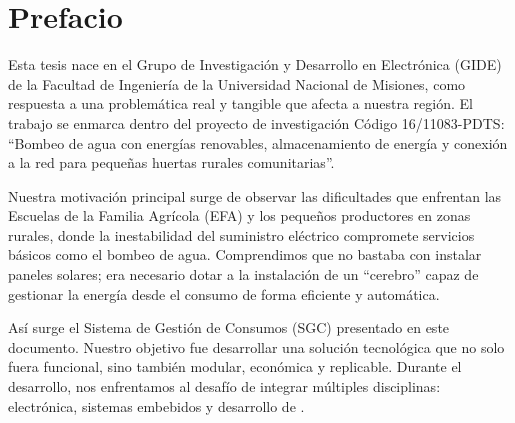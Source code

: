 \cleardoublepage
\chapter*{Prefacio} 

Esta tesis nace en el Grupo de Investigación y Desarrollo en Electrónica (GIDE) de la Facultad de Ingeniería de la Universidad Nacional de Misiones, como respuesta a una problemática real y tangible que afecta a nuestra región. El trabajo se enmarca dentro del proyecto de investigación Código 16/11083-PDTS: “Bombeo de agua con energías renovables, almacenamiento de energía y conexión a la red para pequeñas huertas rurales comunitarias”.

Nuestra motivación principal surge de observar las dificultades que enfrentan las Escuelas de la Familia Agrícola (EFA) y los pequeños productores en zonas rurales, donde la inestabilidad del suministro eléctrico compromete servicios básicos como el bombeo de agua. Comprendimos que no bastaba con instalar paneles solares; era necesario dotar a la instalación de un ``cerebro'' capaz de gestionar la energía desde el consumo de forma eficiente y automática.

Así surge el Sistema de Gestión de Consumos (SGC) presentado en este documento. Nuestro objetivo fue desarrollar una solución tecnológica que no solo fuera funcional, sino también modular, económica y replicable. Durante el desarrollo, nos enfrentamos al desafío de integrar múltiples disciplinas: electrónica, sistemas embebidos y desarrollo de .